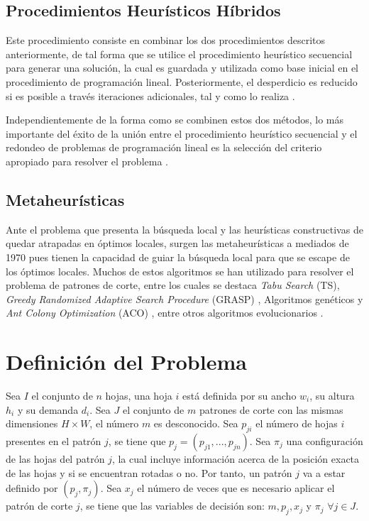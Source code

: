 \documentclass[a4paper,10pt,twocolumn]{article}
\begin{document}
\subsection{Procedimientos Heurísticos Híbridos }
Este procedimiento consiste en combinar los dos
procedimientos descritos anteriormente, de tal forma
que se utilice el procedimiento heurístico secuencial
para generar una solución, la cual es guardada y
utilizada como base inicial en el procedimiento de
programación lineal. Posteriormente, el desperdicio es
reducido si es posible a través iteraciones adicionales,
tal y como lo realiza \cite{41}. 

Independientemente de la forma como
se combinen estos dos métodos, lo más importante
del éxito de la unión entre el procedimiento heurístico
secuencial y el redondeo de problemas de programación
lineal es la selección del criterio apropiado para resolver
el problema \cite{29}.

\subsection{ Metaheurísticas }
Ante el problema que presenta la búsqueda local y
las heurísticas constructivas de quedar atrapadas en
óptimos locales, surgen las metaheurísticas a mediados
de 1970 pues tienen la capacidad de guiar la búsqueda
local para que se escape de los óptimos locales. Muchos
de estos algoritmos se han utilizado para resolver
el problema de patrones de corte, entre los cuales
se destaca \textit{Tabu Search} (TS), \textit{Greedy Randomized
Adaptive Search Procedure} (GRASP) \cite{42}, Algoritmos
genéticos \cite{43,46} y \textit{Ant Colony Optimization} (ACO) \cite{47,48}, entre otros algoritmos evolucionarios \cite{51}.

\section{Definición del Problema}
Sea $I$ el conjunto de $n$ hojas, una hoja $i$ está definida por su ancho $w_i$, su altura $h_i$ y su demanda $d_i$. Sea $J$ el conjunto de $m$ patrones de corte con las mismas dimensiones $H \times W$, el número $m$ es desconocido. Sea $p_{ji}$ el número de hojas $i$ presentes en el patrón $j$, se tiene que $p_j = (p_{j1},...,p_{jn})$. Sea $\pi_j$ una configuración de las hojas del patrón $j$, la cual incluye información acerca de la posición exacta de las hojas y si se encuentran rotadas o no. Por tanto, un patrón $j$ va a estar definido por $(p_j,\pi_j)$. Sea $x_j$ el número de veces que es necesario aplicar el patrón de corte $j$, se tiene que las variables de decisión son: $m, p_j, x_j$ y $\pi_j$ $\forall j \in J$.  
\end{document}
